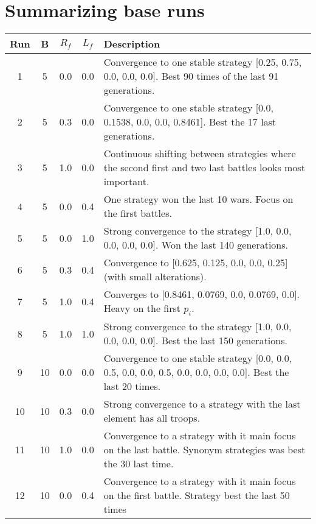 \section{Summarizing base runs}

\begin{center}
\begin{table}[H]
\begin{tabularx}{\textwidth}{ | c | c | c | c | X | }
    \hline Run & B & \( R_f \) & \( L_f \) & Description \\ \hline
    1 & 5 & 0.0 & 0.0 & 
    Convergence to one stable strategy [0.25, 0.75, 0.0, 0.0, 0.0]. Best 90 times of the last 91 generations.
    \\ \hline
    2 & 5 & 0.3 & 0.0 & 
    Convergence to one stable strategy [0.0, 0.1538, 0.0, 0.0, 0.8461]. Best the 17 last generations.
    \\ \hline
    3 & 5 & 1.0 & 0.0 &
    Continuous shifting between strategies where the second first and two last battles looks most important.
    \\ \hline
    4 & 5 & 0.0 & 0.4 &
    One strategy won the last 10 wars. Focus on the first battles. 
    \\ \hline
    5 & 5 & 0.0 & 1.0 &
    Strong convergence to the strategy [1.0, 0.0, 0.0, 0.0, 0.0]. Won the last 140 generations.
    \\ \hline
    6 & 5 & 0.3 & 0.4 &
    Convergence to [0.625, 0.125, 0.0, 0.0, 0.25] (with small alterations).
    \\ \hline
    7 & 5 & 1.0 & 0.4 &
    Converges to [0.8461, 0.0769, 0.0, 0.0769, 0.0]. Heavy on the first $p_i$.
    \\ \hline
    8 & 5 & 1.0 & 1.0 &
    Strong convergence to the strategy [1.0, 0.0, 0.0, 0.0, 0.0]. Best the last 150 generations.
    \\ \hline
    9 & 10 & 0.0 & 0.0 & 
    Convergence to one stable strategy [0.0, 0.0, 0.5, 0.0, 0.0, 0.5, 0.0, 0.0, 0.0, 0.0]. Best the last 20 times.
    \\ \hline
    10 & 10 & 0.3 & 0.0 & 
    Strong convergence to a strategy with the last element has all troops.
    \\ \hline
    11 & 10 & 1.0 & 0.0 &
    Convergence to a strategy with it main focus on the last battle. Synonym strategies was best the 30 last time.
    \\ \hline
    12 & 10 & 0.0 & 0.4 &
    Convergence to a strategy with it main focus on the first battle. Strategy best the last 50 times 
    \\ \hline

\end{tabularx}
\end{table}
\end{center}
